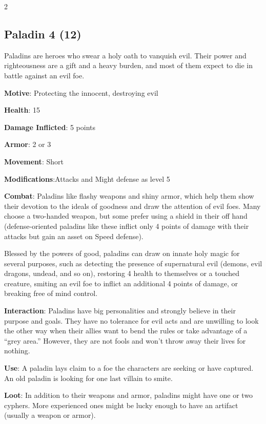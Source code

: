 \begin{multicols}{2}
\subsection{Paladin 4 (12)}

Paladins are heroes who swear a holy oath to vanquish evil. Their power and righteousness are a gift and a heavy burden, and most of them expect to die in battle against an evil foe. 

\textbf{Motive}: Protecting the innocent, destroying evil 

\textbf{Health}: 15 

\textbf{Damage Inflicted}: 5 points 

\textbf{Armor}: 2 or 3 

\textbf{Movement}: Short 

\textbf{Modifications}:Attacks and Might defense as level 5 

\textbf{Combat}: Paladins like flashy weapons and shiny armor, which help them show their devotion to the ideals of goodness and draw the attention of evil foes. Many choose a two-handed weapon, but some prefer using a shield in their off hand (defense-oriented paladins like these inflict only 4 points of damage with their attacks but gain an asset on Speed defense). 

Blessed by the powers of good, paladins can draw on innate holy magic for several purposes, such as detecting the presence of supernatural evil (demons, evil dragons, undead, and so on), restoring 4 health to themselves or a touched creature, smiting an evil foe to inflict an additional 4 points of damage, or breaking free of mind control. 

\textbf{Interaction}: Paladins have big personalities and strongly believe in their purpose and goals. They have no tolerance for evil acts and are unwilling to look the other way when their allies want to bend the rules or take advantage of a “grey area.” However, they are not fools and won’t throw away their lives for nothing. 

\textbf{Use}: A paladin lays claim to a foe the characters are seeking or have captured. An old paladin is looking for one last villain to smite. 

\textbf{Loot}: In addition to their weapons and armor, paladins might have one or two cyphers. More experienced ones might be lucky enough to have an artifact (usually a weapon or armor).


\end{multicols}
